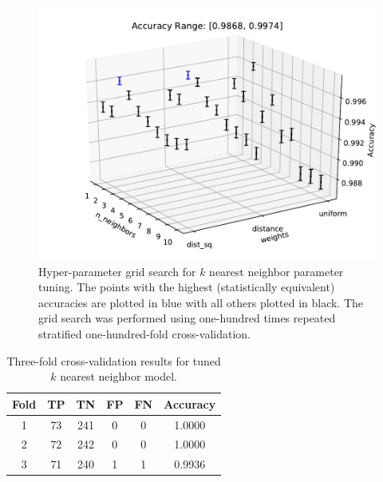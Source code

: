 \documentclass[paper=a4, fontsize=11pt]{scrartcl} %
\begin{document}
\begin{figure}[H]
	\centering
	\includegraphics[scale=0.6]{../output/KNN/KNN_941_486/KNN_gridsearch_941_486_global_standard.pdf}
	\caption{Hyper-parameter grid search for $k$ nearest neighbor parameter tuning. The points with the highest (statistically equivalent) accuracies are plotted in blue with all others plotted in black. The grid search was performed using one-hundred times repeated stratified one-hundred-fold cross-validation.}
	\label{fig: knn grid}
\end{figure}

\begin{table}[H]
	\centering
	\caption{Three-fold cross-validation results for tuned $k$ nearest neighbor model.}
	\begin{tabular}{|c|c|c|c|c|c|}
		\hline
		\textbf{Fold} & \textbf{TP} & \textbf{TN} & \textbf{FP} & \textbf{FN} & \textbf{Accuracy} \\ \hline \hline
		1 & 73 & 241 & 0 & 0 & 1.0000  \\ \hline
		2 & 72 & 242 & 0 & 0 & 1.0000  \\ \hline
		3 & 71 & 240 & 1 & 1 & 0.9936  \\ \hline
	\end{tabular}
	\label{tab: cv best knn}
\end{table}
\end{document}
